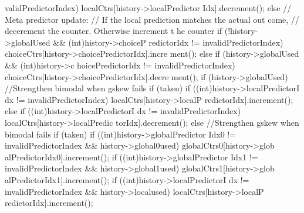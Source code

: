 \begin{DoxyCode}
{{{{{      validPredictorIndex)
                                                localCtrs[history->localPredictor
      Idx].decrement();
                                }
                        } else {
                                // Meta predictor update:
                                // If the local prediction matches the actual out
      come,
                                // decerement the counter.  Otherwise increment t
      he counter
                                if (!history->globalUsed && (int)history->choiceP
      redictorIdx != invalidPredictorIndex) {
                                    choiceCtrs[history->choicePredictorIdx].incre
      ment();
                                } else if (history->globalUsed && (int)history->c
      hoicePredictorIdx != invalidPredictorIndex) {
                                    choiceCtrs[history->choicePredictorIdx].decre
      ment();
                                }
                                if (history->globalUsed) {
                                   //Strengthen bimodal when gskew fails
                                        if (taken) {
                                                if ((int)history->localPredictorI
      dx != invalidPredictorIndex)
                                                        localCtrs[history->localP
      redictorIdx].increment();
                                        } else {
                                                if ((int)history->localPredictorI
      dx != invalidPredictorIndex)
                                                   localCtrs[history->localPredic
      torIdx].decrement();
                                        }
                                } else {
                                   //Strengthen gskew when bimodal fails
                                        if (taken) {
                                                if ((int)history->globalPredictor
      Idx0 != invalidPredictorIndex && history->global0used)
                                                        globalCtrs0[history->glob
      alPredictorIdx0].increment();
                                                if ((int)history->globalPredictor
      Idx1 != invalidPredictorIndex && history->global1used)
                                                        globalCtrs1[history->glob
      alPredictorIdx1].increment();
                                                if ((int)history->localPredictorI
      dx != invalidPredictorIndex && history->localused)
                                                        localCtrs[history->localP
      redictorIdx].increment();
}}}}}}
\end{DoxyCode}
